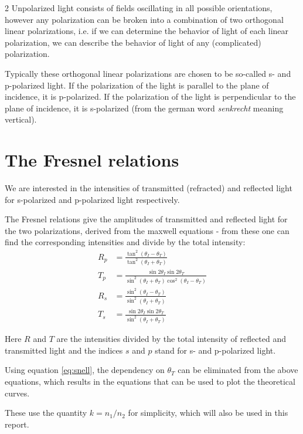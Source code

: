 \documentclass[a4paper,oneside,article]{memoir}
\begin{document}
\begin{multicols}{2}
Unpolarized light consists of fields oscillating in all possible orientations, however any polarization can be broken into a combination of two orthogonal linear polarizations, i.e. if we can determine the behavior of light of each linear polarization, we can describe the behavior of light of any (complicated) polarization. 

Typically these orthogonal linear polarizations are chosen to be so-called s- and p-polarized light. If the polarization of the light is parallel to the plane of incidence, it is p-polarized. If the polarization of the light is perpendicular to the plane of incidence, it is s-polarized (from the german word \textit{senkrecht} meaning vertical). 

\section{The Fresnel relations}
We are interested in the intensities of transmitted (refracted) and reflected light for s-polarized and p-polarized light respectively. 

The Fresnel relations \cite{griff} give the amplitudes of transmitted and reflected light for the two polarizations, derived from the maxwell equations - from these one can find the corresponding intensities and divide by the total intensity:
\begin{align}
    R_p &= \frac{\tan^2(\theta_I-\theta_T)}{\tan^2(\theta_I+\theta_T)} \label{eq:rp1}\\
    T_p &= \frac{\sin2\theta_I\sin2\theta_T}{\sin^2(\theta_I+\theta_T)\cos^2(\theta_I-\theta_T)} \label{eq:tp1}\\
    R_s &= \frac{\sin^2(\theta_I-\theta_T)}{\sin^2(\theta_I+\theta_T)} \label{eq:rs1}\\
    T_s &= \frac{\sin2\theta_I\sin2\theta_T}{\sin^2(\theta_I+\theta_T)}\label{eq:ts1}
\end{align}

Here $R$ and $T$ are the intensities divided by the total intensity of reflected and transmitted light and the indices $s$ and $p$ stand for s- and p-polarized light. 

Using equation \ref{eq:snell}, the dependency on $\theta_T$ can be eliminated from the above equations, which results in the equations that can be used to plot the theoretical curves.

These use the quantity $k=n_1/n_2$ for simplicity, which will also be used in this report.


\end{multicols}
\end{document}

